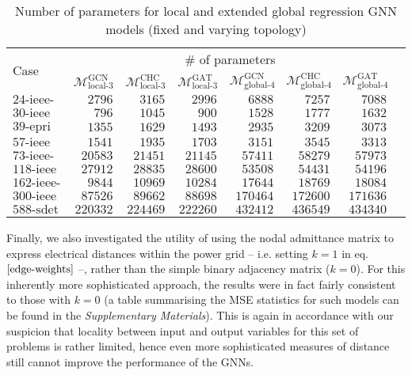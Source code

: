 \documentclass[journal]{IEEEtran}
\begin{document}
\begin{table*}[!ht]
\small
\caption{Number of parameters for local and extended global regression GNN models (fixed and varying topology)}
\label{tab:params_reg_local}
\def\na{---}
\centering
    \begin{tabular}{lrrr|rrrr}
    \toprule
    \multirow{2}{*}{Case} & \multicolumn{6}{c}{\# of parameters} \\ 
    \cmidrule(r){2-7}
    &$\mathcal{M}^{\textrm{GCN}}_{\textrm{local-3}}$ & $\mathcal{M}^{\textrm{CHC}}_{\textrm{local-3}}$ & $\mathcal{M}^{\textrm{GAT}}_{\textrm{local-3}}$ & $\mathcal{M}^{\textrm{GCN}}_{\textrm{global-4}}$ & $\mathcal{M}^{\textrm{CHC}}_{\textrm{global-4}}$ & $\mathcal{M}^{\textrm{GAT}}_{\textrm{global-4}}$ \\
    \midrule
    $\textrm{24-ieee-rts}$ & $2796$ & $3165$ & $2996$ & $6888$ & $7257$ & $7088$ \\
    $\textrm{30-ieee}$ & $796$ & $1045$ & $900$ & $1528$ & $1777$ & $1632$ \\
    $\textrm{39-epri}$ & $1355$ & $1629$ & $1493$ & $2935$ & $3209$ & $3073$ \\
    $\textrm{57-ieee}$ & $1541$ & $1935$ & $1703$ & $3151$ & $3545$ & $3313$ \\
    $\textrm{73-ieee-rts}$ & $20583$ & $21451$ & $21145$ & $57411$ & $58279$ & $57973$ \\
    $\textrm{118-ieee}$ & $27912$ & $28835$ & $28600$ & $53508$ & $54431$ & $54196$ \\
    $\textrm{162-ieee-dtc}$ & $9844$ & $10969$ & $10284$ & $17644$ & $18769$ & $18084$ \\
    $\textrm{300-ieee}$ & $87526$ & $89662$ & $88698$ & $170464$ & $172600$ & $171636$ \\
    $\textrm{588-sdet}$ & $220332$ & $224469$ & $222260$ & $432412$ & $436549$ & $434340$ \\
    \bottomrule
    \end{tabular}
\end{table*}

Finally, we also investigated the utility of using the nodal admittance matrix to express electrical distances within the power grid -- i.e. setting $k = 1$ in eq. $\eqref{edge-weights}$ --, rather than the simple binary adjacency matrix ($k = 0$). For this inherently more sophisticated approach, the results were in fact fairly consistent to those with $k = 0$ (a table summarising the MSE statistics for such models can be found in the \textit{Supplementary Materials}).
This is again in accordance with our suspicion that locality between input and output variables for this set of problems is rather limited, hence even more sophisticated measures of distance still cannot improve the performance of the GNNs.
\end{document}
